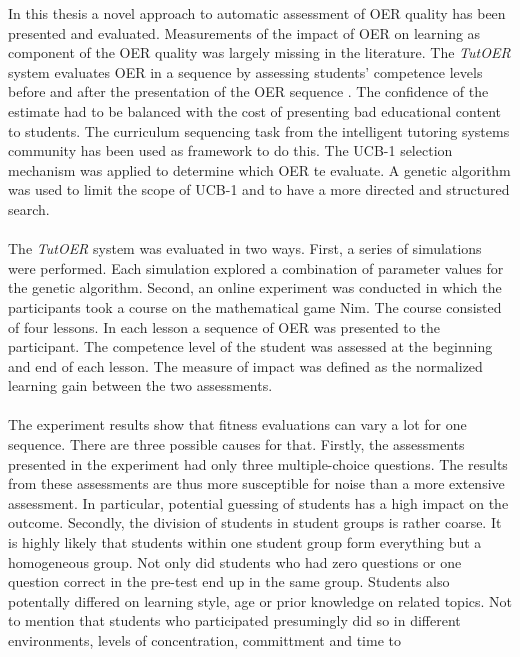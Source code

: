 
In this thesis a novel approach to automatic assessment of OER quality has been
presented and evaluated. Measurements of the impact of OER on learning as
component of the OER quality was largely missing in the literature. The
\emph{TutOER} system evaluates OER in a sequence by assessing students' competence levels
before and after the presentation of the OER sequence . The confidence of the estimate
had to be balanced with the cost of presenting bad educational content to
students. The curriculum sequencing task from the intelligent tutoring systems
community has been used as framework to do this. The UCB-1 selection mechanism
was applied to determine which OER te evaluate. A genetic algorithm was used
to limit the scope of UCB-1 and to have a more directed and structured
search.\\\\
\noindent
The \emph{TutOER} system was evaluated in two ways. First, a series of
simulations were performed. Each simulation explored a combination of parameter
values for the genetic algorithm. Second, an online experiment was conducted
in which the participants took a course on the mathematical game Nim. The
course consisted of four lessons. In each lesson a sequence of OER was
presented to the participant. The competence level of the student was assessed
at the beginning and end of each lesson. The measure of impact was defined as
the normalized learning gain between the two assessments.\\\\
\noindent
The experiment results show that fitness evaluations can vary a lot for one
sequence. There are three possible causes for that. Firstly, the assessments
presented in the experiment had only three multiple-choice questions. The
results from these assessments are thus more susceptible for noise than a more
extensive assessment. In particular, potential guessing of students has a high
impact on the outcome. Secondly, the division of students in student groups is
rather coarse. It is highly likely that students within one student group form
everything but a homogeneous group. Not only did students who had zero
questions or one question correct in the pre-test end up in the same group.
Students also potentally differed on learning style, age or prior knowledge on
related topics. Not to mention that students who participated presumingly did
so in different environments, levels of concentration, committment and time to
